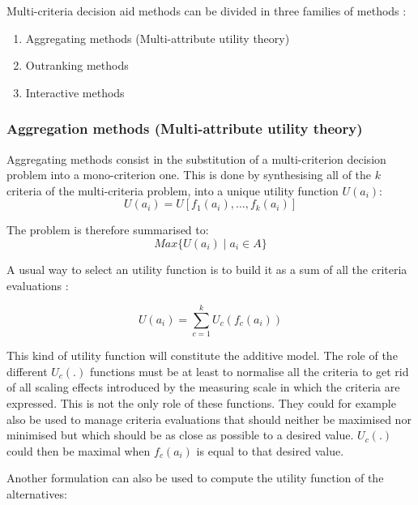 Multi-criteria decision aid methods can be divided in three families of methods \cite{Bertrand2002}:
\begin{enumerate}
    \item Aggregating methods (Multi-attribute utility theory)
    \item Outranking methods
    \item Interactive methods
\end{enumerate}

\subsubsection{Aggregation methods (Multi-attribute utility theory)}
Aggregating methods consist in the substitution of a multi-criterion decision problem into a mono-criterion one.
This is done by synthesising all of the $k$ criteria of the multi-criteria problem, into a unique utility function $U(a_i)$:
\begin{equation}
    U(a_i) = U[f_1(a_i), \dots, f_k(a_i)]
    \label{eq:utility_fct}
\end{equation}

The problem is therefore summarised to:
\begin{equation}
    Max \{U(a_i) \mid a_i \in A \}
    \label{eq:maut_model}
\end{equation}

A usual way to select an utility function is to build it as a sum of all the criteria evaluations \cite{Vin92}:

\begin{equation}
    U(a_i) = \sum\limits^k_{c=1} U_c(f_c(a_i))
    \label{eq:maut_additive_utility_function}
\end{equation}

This kind of utility function will constitute the additive model. 
The role of the different $U_c(.)$ functions must be at least to normalise all the criteria to get rid of all scaling effects introduced by the measuring scale in which the criteria are expressed.
This is not the only role of these functions. They could for example also be used to manage criteria evaluations that should neither be maximised nor minimised but which should be as close as possible to a desired value. $U_c(.)$ could then be maximal when $f_c(a_i)$ is equal to that desired value.

Another formulation can also be used to compute the utility function of the alternatives:


